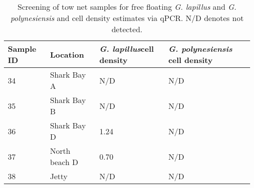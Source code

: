 \documentclass[12pt]{article}
\begin{document}
\begin{table}
\caption{Screening of tow net samples for free floating \emph{G. lapillus} and \emph{G. polynesiensis} and cell density estimates via qPCR. N/D denotes not detected.}
\label{tbl:NetTable}
\begin{tabular}{ | p{4cm} | p{4cm} |p{4cm} | p{4cm} | }
\hline
\textbf{Sample ID}&\textbf{Location}&\textbf{\emph{G. lapillus}cell density}&\textbf{\emph{G. polynesiensis} cell density}\\
\hline
34&Shark Bay A&N/D&N/D\\ %
\hline
35&Shark Bay B&N/D&N/D\\
\hline
36&Shark Bay D&1.24
&N/D\\
\hline
37&North beach D&0.70
&N/D\\
\hline
38&Jetty&N/D
&N/D\\
\hline
\end{tabular}
\end{table}
\FloatBarrier
\newpage
\end{document}
